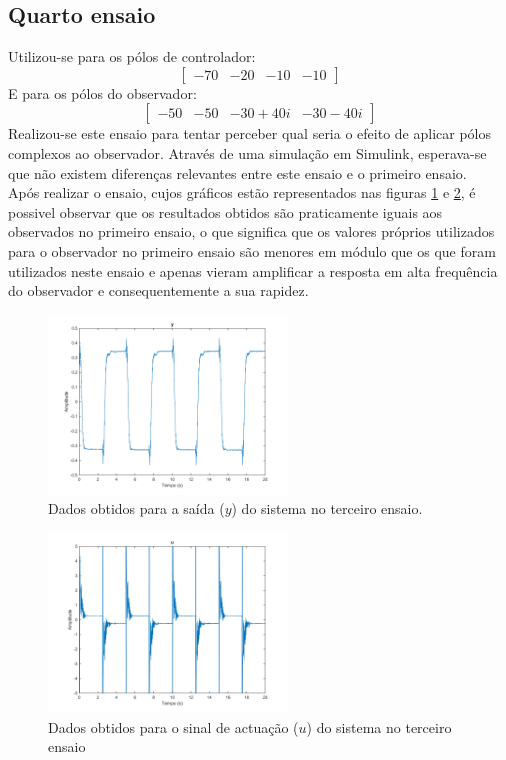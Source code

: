 \documentclass[%
  reprint,
  nofootinbib,
  amsmath,amssymb,
  aps,
  10pt,
  a4paper
]{revtex4-1}
\begin{document}
\subsection{Quarto ensaio}
Utilizou-se para os pólos de controlador:
\begin{equation}
\begin{bmatrix}
-70 & -20 & -10 &-10
\end{bmatrix}
\end{equation}
E para os pólos do observador:
\begin{equation}
\begin{bmatrix}
-50 & -50 & -30+40i &-30-40i
\end{bmatrix}
\end{equation}
Realizou-se este ensaio para tentar perceber qual seria o efeito de aplicar pólos complexos ao observador. Através de uma simulação em Simulink, esperava-se que não existem diferenças relevantes entre este ensaio e o primeiro ensaio.\\
Após realizar o ensaio, cujos gráficos estão representados nas figuras \ref{fig:y_f} e \ref{fig:u_f}, é possivel observar que os resultados obtidos são praticamente iguais aos observados no primeiro ensaio, o que significa que os valores próprios utilizados para o observador no primeiro ensaio são menores em módulo que os que foram utilizados neste ensaio e apenas vieram amplificar a resposta em alta frequência do observador e consequentemente a sua rapidez.
\begin{figure}[H]
\includegraphics[width=2.5in]{../imgs/dados_00_f/dados_00_f_y.png}
\caption{Dados obtidos para a saída ($y$) do sistema no terceiro ensaio.}
\label{fig:y_f}
\end{figure}
\begin{figure}[H]
\includegraphics[width=2.5in]{../imgs/dados_00_f/dados_00_f_u.png}
\caption{Dados obtidos para o sinal de actuação ($u$) do sistema no terceiro ensaio}
\label{fig:u_f}
\end{figure}
\end{document}
